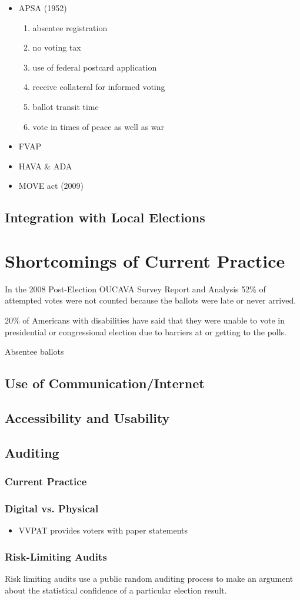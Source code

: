 \begin{itemize}
\item APSA (1952)
\begin{enumerate}
\item absentee registration
\item no voting tax
\item use of federal postcard application
\item receive collateral for informed voting
\item ballot transit time %
\item vote in times of peace as well as war
\end{enumerate}
\item FVAP
\item HAVA \& ADA
\item MOVE act (2009) %
\end{itemize}

\subsection{Integration with Local Elections}

\section{Shortcomings of Current Practice}



In the 2008 Post-Election OUCAVA Survey Report and Analysis 52\% of attempted votes were not counted because the ballots were late or never arrived.

20\% of Americans with disabilities have said that they were unable to vote in presidential or congressional election due to barriers at or getting to the polls.

Absentee ballots 

\subsection{Use of Communication/Internet}
\subsection{Accessibility and Usability}
\subsection{Auditing}
\subsubsection{Current Practice}
\subsubsection{Digital vs. Physical}
\begin{itemize}
\item VVPAT provides voters with paper statements
\end{itemize}
\subsubsection{Risk-Limiting Audits}
Risk limiting audits use a public random auditing process to make an argument about the statistical confidence of a particular election result.
